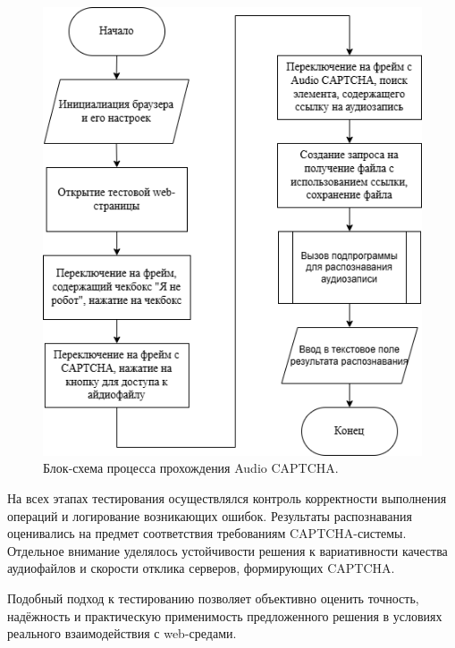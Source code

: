 \begin{figure}[H]
    \centering
    \includegraphics[width=0.6\linewidth]{imgs/audiocaptcha/captcha_solve.png}
    \caption{Блок-схема процесса прохождения Audio CAPTCHA.}
    \label{fig:audio-solver}
\end{figure}

На всех этапах тестирования осуществлялся контроль корректности выполнения 
операций и логирование возникающих ошибок. Результаты распознавания оценивались 
на предмет соответствия требованиям CAPTCHA-системы. Отдельное внимание уделялось 
устойчивости решения к вариативности качества аудиофайлов и скорости отклика 
серверов, формирующих CAPTCHA.

Подобный подход к тестированию позволяет объективно оценить точность, надёжность 
и практическую применимость предложенного решения в условиях реального 
взаимодействия с web-средами.
